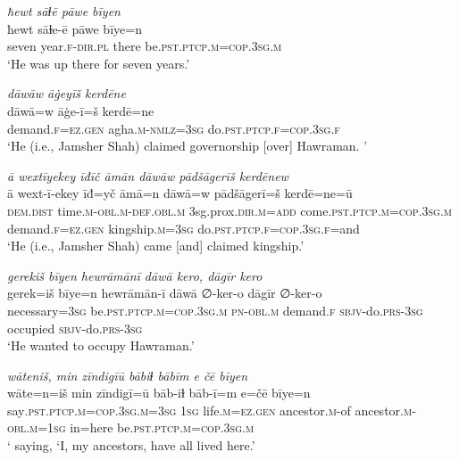 \ea \label{DP.11}
\textit{ħewt sāɫē pāwe bīyen} \\ 
\gll ħewt sāɫe-ē pāwe bīye=n \\ 
 seven year\textsc{\textsc{.f}}\textsc{-dir}\textsc{.pl} there be\textsc{.pst}\textsc{.ptcp}\textsc{.m}\textsc{=cop}\textsc{.3sg}\textsc{.m} \\ 
\glt `He was up there for seven years.'
\z 
 
\ea \label{DP.13}
\textit{dāwāw āġeyīš kerdēne} \\ 
\gll dāwā=w āġe-ī=š kerdē=ne \\ 
 demand\textsc{\textsc{.f}}\textsc{=ez}\textsc{.gen} agha\textsc{.m}\textsc{-nmlz}\textsc{=3sg} do\textsc{.pst}\textsc{.ptcp}\textsc{\textsc{.f}}\textsc{=cop}\textsc{.3sg}\textsc{\textsc{.f}} \\ 
\glt `He (i.e., Jamsher Shah) claimed governorship [over] Hawraman. '
\z 
 
\ea \label{DP.17}
\textit{ā wextīyekey īđīč āmān dāwāw pādšāgerīš kerdēnew} \\ 
\gll ā wext-ī-ekey īđ=yč āmā=n dāwā=w pādšāgerī=š kerdē=ne=ū \\ 
 \textsc{dem.dist} time\textsc{.m}\textsc{-obl}\textsc{.m}\textsc{-def}\textsc{.obl}\textsc{.m} 3sg.prox\textsc{.dir}\textsc{.m}\textsc{=add} come\textsc{.pst}\textsc{.ptcp}\textsc{.m}\textsc{=cop}\textsc{.3sg}\textsc{.m} demand\textsc{\textsc{.f}}\textsc{=ez}\textsc{.gen} kingship\textsc{.m}\textsc{=3sg} do\textsc{.pst}\textsc{.ptcp}\textsc{\textsc{.f}}\textsc{=cop}\textsc{.3sg}\textsc{\textsc{.f}}=and \\ 
\glt `He (i.e., Jamsher Shah) came [and] claimed kingship.'
\z 
 
\ea \label{DP.18}
\textit{gerekiš bīyen hewrāmānī dāwā kero, dāgīr kero} \\ 
\gll gerek=iš bīye=n hewrāmān-ī dāwā ∅-ker-o dāgīr ∅-ker-o \\ 
 necessary\textsc{=3sg} be\textsc{.pst}\textsc{.ptcp}\textsc{.m}\textsc{=cop}\textsc{.3sg}\textsc{.m} \textsc{pn}\textsc{-obl}\textsc{.m} demand\textsc{\textsc{.f}} \textsc{sbjv-}do\textsc{.prs}\textsc{-3sg} occupied \textsc{sbjv-}do\textsc{.prs}\textsc{-3sg} \\ 
\glt `He wanted to occupy Hawraman.'
\z 
 
\ea \label{DP.20}
\textit{wāteniš, min zīndigīū bābiɫ bābīm e čē bīyen} \\ 
\gll wāte=n=iš min zīndigī=ū bāb-iɫ bāb-ī=m e=čē bīye=n \\ 
 say\textsc{.pst}\textsc{.ptcp}\textsc{.m}\textsc{=cop}\textsc{.3sg}\textsc{.m}\textsc{=3sg} \textsc{1sg} life\textsc{.m}\textsc{=ez}\textsc{.gen} ancestor\textsc{.m}-of ancestor\textsc{.m}\textsc{-obl}\textsc{.m}\textsc{=1sg} in=here be\textsc{.pst}\textsc{.ptcp}\textsc{.m}\textsc{=cop}\textsc{.3sg}\textsc{.m} \\ 
\glt ` saying, ‘I, my ancestors, have all lived here.'
\z 
 
